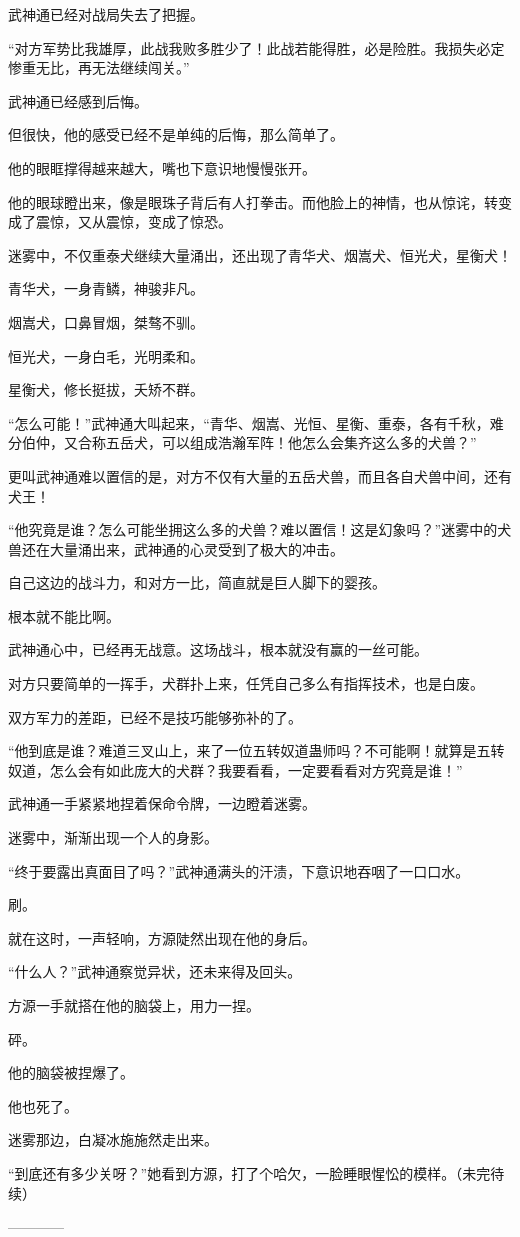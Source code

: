 \begin{this_body}
武神通已经对战局失去了把握。

“对方军势比我雄厚，此战我败多胜少了！此战若能得胜，必是险胜。我损失必定惨重无比，再无法继续闯关。”

武神通已经感到后悔。

但很快，他的感受已经不是单纯的后悔，那么简单了。

他的眼眶撑得越来越大，嘴也下意识地慢慢张开。

他的眼球瞪出来，像是眼珠子背后有人打拳击。而他脸上的神情，也从惊诧，转变成了震惊，又从震惊，变成了惊恐。

迷雾中，不仅重泰犬继续大量涌出，还出现了青华犬、烟嵩犬、恒光犬，星衡犬！

青华犬，一身青鳞，神骏非凡。

烟嵩犬，口鼻冒烟，桀骜不驯。

恒光犬，一身白毛，光明柔和。

星衡犬，修长挺拔，夭矫不群。

“怎么可能！”武神通大叫起来，“青华、烟嵩、光恒、星衡、重泰，各有千秋，难分伯仲，又合称五岳犬，可以组成浩瀚军阵！他怎么会集齐这么多的犬兽？”

更叫武神通难以置信的是，对方不仅有大量的五岳犬兽，而且各自犬兽中间，还有犬王！

“他究竟是谁？怎么可能坐拥这么多的犬兽？难以置信！这是幻象吗？”迷雾中的犬兽还在大量涌出来，武神通的心灵受到了极大的冲击。

自己这边的战斗力，和对方一比，简直就是巨人脚下的婴孩。

根本就不能比啊。

武神通心中，已经再无战意。这场战斗，根本就没有赢的一丝可能。

对方只要简单的一挥手，犬群扑上来，任凭自己多么有指挥技术，也是白废。

双方军力的差距，已经不是技巧能够弥补的了。

“他到底是谁？难道三叉山上，来了一位五转奴道蛊师吗？不可能啊！就算是五转奴道，怎么会有如此庞大的犬群？我要看看，一定要看看对方究竟是谁！”

武神通一手紧紧地捏着保命令牌，一边瞪着迷雾。

迷雾中，渐渐出现一个人的身影。

“终于要露出真面目了吗？”武神通满头的汗渍，下意识地吞咽了一口口水。

刷。

就在这时，一声轻响，方源陡然出现在他的身后。

“什么人？”武神通察觉异状，还未来得及回头。

方源一手就搭在他的脑袋上，用力一捏。

砰。

他的脑袋被捏爆了。

他也死了。

迷雾那边，白凝冰施施然走出来。

“到底还有多少关呀？”她看到方源，打了个哈欠，一脸睡眼惺忪的模样。（未完待续）

------------

\end{this_body}

